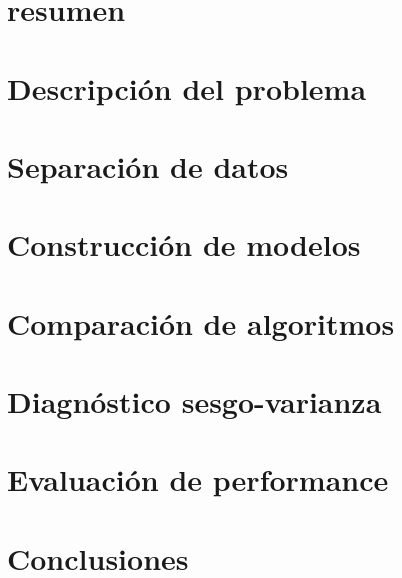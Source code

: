 \documentclass{./packages/informe}
\begin{document}
 



\section*{resumen}


\vspace{1em}
\tableofcontents
\newpage

\section{Descripción del problema}


\section{Separación de datos}


\section{Construcción de modelos}


\vspace{1em}
\section{Comparación de algoritmos}


\vspace{1em}
\section{Diagnóstico sesgo-varianza}


\vspace{1em}
\section{Evaluación de performance}


\vspace{1em}
\section{Conclusiones}


% 

\newpage


\end{document}
